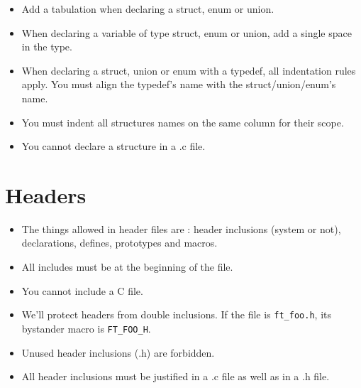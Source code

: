 \documentclass{42-en}
\begin{document}
        \begin{itemize}

            \item Add a tabulation when declaring a struct, enum or union.

            \item When declaring a variable of type struct, enum or union,
                add a single space in the type.

            \item When declaring a struct, union or enum with a typedef,
                all indentation rules apply. You must align the typedef's name
                with the struct/union/enum's name.

            \item You must indent all structures names on the same column for their scope.

            \item You cannot declare a structure in a .c file.

        \end{itemize}
        \newpage


    \section{Headers}

        \begin{itemize}

            \item The things allowed in header files are :
                header inclusions (system or not), declarations, defines,
                prototypes and macros.

            \item All includes must be at the beginning of the file.

            \item You cannot include a C file.

            \item We'll protect headers from double inclusions. If the file is
            \texttt{ft\_foo.h}, its bystander macro is \texttt{FT\_FOO\_H}.

            \item Unused header inclusions (.h) are forbidden.

            \item All header inclusions must be justified in a .c file
                as well as in a .h file.

        \end{itemize}
\end{document}
